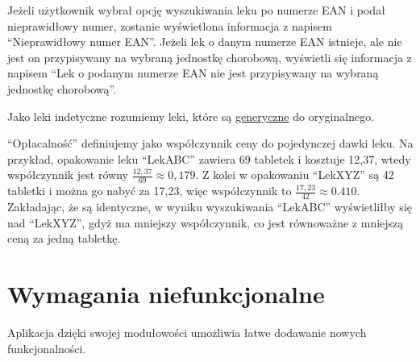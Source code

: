 \documentclass{article}
\begin{document}
  Jeżeli użytkownik wybrał opcję wyszukiwania leku po numerze EAN i podał nieprawidłowy numer, zostanie wyświetlona informacja z napisem
  ``Nieprawidłowy numer EAN''.
  Jeżeli lek o danym numerze EAN istnieje, ale nie jest on przypisywany na wybraną jednostkę chorobową, wyświetli się informacja z napisem
  ``Lek o podanym numerze EAN nie jest przypisywany na wybraną jednostkę chorobową''.

  Jako leki indetyczne rozumiemy leki, które są
  \href{https://www.eupati.eu/pl/rodzaje-lekow/leki-generyczne/}{generyczne} do oryginalnego.

  ``Opłacalność'' definiujemy jako współczynnik ceny do pojedynczej dawki leku.
  Na przykład, opakowanie leku ``LekABC'' zawiera 69 tabletek i kosztuje 12,37, wtedy współczynnik jest równy $\frac{12,37}{69} \approx 0,179$.
  Z kolei w opakowaniu ``LekXYZ'' są 42 tabletki i można go nabyć za 17,23, więc współczynnik to $\frac{17,23}{42} \approx 0.410$.
  Zakładając, że są identyczne, w wyniku wyszukiwania ``LekABC'' wyświetliłby się nad ``LekXYZ'', gdyż ma mniejszy współczynnik,
  co jest równoważne z mniejszą ceną za jedną tabletkę.

  \section{Wymagania niefunkcjonalne}

  Aplikacja dzięki swojej modułowości umożliwia łatwe dodawanie nowych funkcjonalności.
\end{document}
